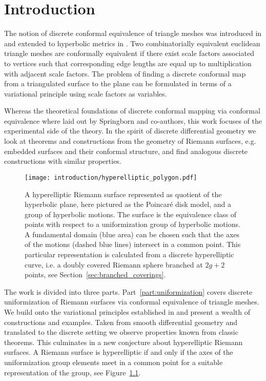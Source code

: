 \documentclass[Thesis.tex]{subfiles}
\begin{document}
\chapter{Introduction}

The notion of discrete conformal equivalence of triangle meshes was introduced in \cite{Springborn2008} and extended to hyperbolic metrics in \cite{Bobenko2010}. Two combinatorially equivalent euclidean triangle meshes are conformally equivalent if there exist scale factors associated to vertices such that corresponding edge lengths are equal up to multiplication with adjacent scale factors.
The problem of finding a discrete conformal map from a triangulated surface to the plane can be formulated in terms of a variational principle using scale factors as variables. 

Whereas the theoretical foundations of discrete conformal mapping via conformal equivalence where laid out by Springborn and co-authors, this work focuses of the experimental side of the theory. In the spirit of discrete differential geometry we look at theorems and constructions from the geometry of Riemann surfaces, e.g. embedded surfaces and their conformal structure, and find analogous discrete constructions with similar properties.

\begin{figure}[h]
\centering
\texttt{[image: introduction/hyperelliptic\_polygon.pdf]}
\caption{A hyperelliptic Riemann surface represented as quotient of the hyperbolic plane, here pictured as the Poincar{\'e} disk model, and a group of hyperbolic motions. The surface is the equivalence class of points with respect to a uniformization group of hyperbolic motions. A fundamental domain (blue area) can be chosen such that the axes of the motions (dashed blue lines) intersect in a common point. This particular representation is calculated from a discrete hyperelliptic curve, i.e. a doubly covered Riemann sphere branched at $2g + 2$ points, see Section~\ref{sec:branched_coverings}.}
\label{fig:intro_hyperelliptic_surface}
\end{figure}

The work is divided into three parts. Part~\ref{part:uniformization} covers discrete uniformization of Riemann surfaces via conformal equivalence of triangle meshes. We build onto the variational principles established in \cite{Bobenko2010} and present a wealth of constructions and examples. Taken from smooth differential geometry and translated to the discrete setting we observe properties known from classic theorems. This culminates in a new conjecture about hyperelliptic Riemann surfaces. A Riemann surface is hyperelliptic if and only if the axes of the uniformization group elements meet in a common point for a suitable representation of the group, see Figure~\ref{fig:intro_hyperelliptic_surface}.
\end{document}
